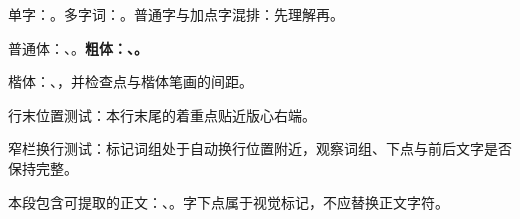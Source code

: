 \documentclass[student]{../src/workbook}
\begin{document}

单字：。多字词：。普通字与加点字混排：先理解再。

普通体：、。\textbf{粗体：、。}

{\kaishu 楷体：、，并检查点与楷体笔画的间距。}\par

\noindent\parbox[t]{0.72\linewidth}{行末位置测试：本行末尾的着重点贴近版心右端。\hfill{}}\par

\medskip
\noindent\parbox[t]{0.47\linewidth}{窄栏换行测试：标记词组处于自动换行位置附近，观察词组、下点与前后文字是否保持完整。}

\noindent 本段包含可提取的正文：、。字下点属于视觉标记，不应替换正文字符。
\end{document}
